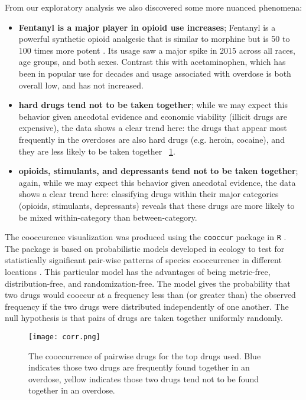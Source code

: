 \documentclass{article}
\begin{document}
From our exploratory analysis we also discovered some more nuanced phenomena:
\begin{itemize}
\item {\bf Fentanyl is a major player in opioid use increases}; Fentanyl is a powerful synthetic opioid analgesic that is similar to morphine but is 50 to 100 times more potent \citep{nids16}. Its usage saw a major spike in 2015 across all races, age groups, and both sexes. Contrast this with acetaminophen, which has been in popular use for decades and usage associated with overdose is both overall low, and has not increased.
\item {\bf hard drugs tend not to be taken together}; while we may expect this behavior given anecdotal evidence and economic viability (illicit drugs are expensive), the data shows a clear trend here: the drugs that appear most frequently in the overdoses are also hard drugs (e.g. heroin, cocaine), and they are less likely to be taken together ~\ref{fig:corr}.
\item {\bf opioids, stimulants, and depressants tend not to be taken together}; again, while we may expect this behavior given anecdotal evidence, the data shows a clear trend here: classifying drugs within their major categories (opioids, stimulants, depressants) reveals that these drugs are more likely to be mixed within-category than between-category.
\end{itemize}
The cooccurence visualization was produced using the \texttt{cooccur} package in \texttt{R} \citep{griffith16}. The package is based on probabilistic models developed in ecology to test for statistically significant pair-wise patterns of species cooccurrence in different locations \citep{veech12}. This particular model has the advantages of being metric-free, distribution-free, and randomization-free. The model gives the probability that two drugs would cooccur at a frequency less than (or greater than) the observed frequency if the two drugs were distributed independently of one another. The null hypothesis is that pairs of drugs are taken together uniformly randomly.

\begin{figure}[h]
\centering
\texttt{[image: corr.png]}
\caption{The cooccurrence of pairwise drugs for the top drugs used. Blue indicates those two drugs are frequently found together in an overdose, yellow indicates those two drugs tend not to be found together in an overdose.}
\label{fig:corr}
\end{figure}
\end{document}
